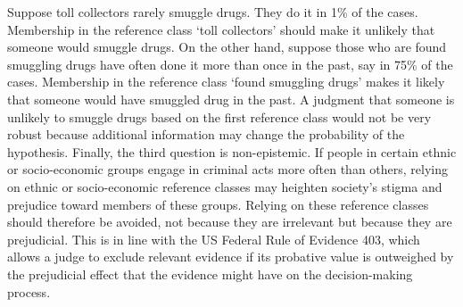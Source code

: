 \documentclass{article}
\begin{document}
Suppose toll collectors rarely smuggle drugs. They do it in 1\% of the cases. Membership in the reference class `toll collectors' should make it unlikely that someone would smuggle drugs. On the other hand, suppose those who are found smuggling drugs have often done it more than once in the past, say in 75\% of the cases. Membership in the reference class `found smuggling drugs' makes it likely that someone would have smuggled drug in the past. A judgment that someone is unlikely to smuggle drugs based on the first reference class would not be very robust because additional information may change the probability of the hypothesis. 
Finally, the third question is non-epistemic. 
 If people in certain ethnic or socio-economic groups engage in criminal acts more often than others, relying on ethnic or socio-economic reference classes may heighten society's stigma and  prejudice toward members of these groups. 
 Relying on these reference classes should therefore be avoided, not because they are irrelevant but because they are prejudicial. 
 This is in line with the US Federal Rule of Evidence 403, which allows a judge to exclude relevant evidence if its probative value is outweighed by the prejudicial effect that the evidence might have on the decision-making process.  
\end{document}
